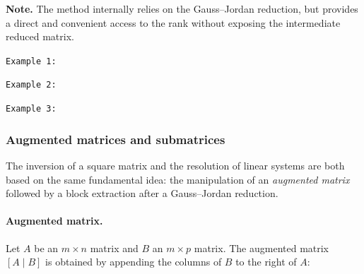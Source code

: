 \medskip
\noindent
\textbf{Note.}
The method  internally relies on the Gauss–Jordan reduction, but provides a direct and convenient access to the rank without exposing the intermediate reduced matrix.

\texttt{Example 1: }

\begin{tkzexample}[latex=.5\textwidth]
\end{tkzexample}

\texttt{Example 2: }

\begin{tkzexample}[latex=.5\textwidth]
\end{tkzexample}

\texttt{Example 3: }

\begin{tkzexample}[latex=.5\textwidth]


\end{tkzexample}


\subsubsection{Augmented matrices and submatrices}
\label{ssub:matrix-augmentation-submatrix}

The inversion of a square matrix and the resolution of linear systems are both
based on the same fundamental idea: the manipulation of an \emph{augmented matrix}
followed by a block extraction after a Gauss--Jordan reduction.

\medskip

\paragraph{Augmented matrix.}
Let $A$ be an $m\times n$ matrix and $B$ an $m\times p$ matrix.
The augmented matrix $[A \mid B]$ is obtained by appending the columns of $B$
to the right of $A$:

